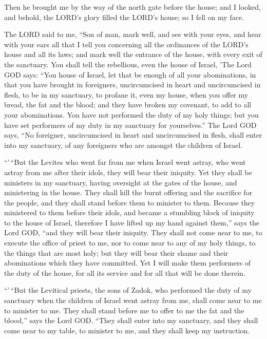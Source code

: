  Then he brought me by the way of the north gate before
the house; and I looked, and behold, the LORD's glory filled the LORD's
house; so I fell on my face.

 The LORD said to me, ``Son of man, mark well, and see
with your eyes, and hear with your ears all that I tell you concerning
all the ordinances of the LORD's house and all its laws; and mark well
the entrance of the house, with every exit of the sanctuary.
 You shall tell the rebellious, even the house of Israel,
'The Lord GOD says: ``You house of Israel, let that be enough of all
your abominations,  in that you have brought in
foreigners, uncircumcised in heart and uncircumcised in flesh, to be in
my sanctuary, to profane it, even my house, when you offer my bread, the
fat and the blood; and they have broken my covenant, to add to all your
abominations.  You have not performed the duty of my holy
things; but you have set performers of my duty in my sanctuary for
yourselves.''  The Lord GOD says, ``No foreigner,
uncircumcised in heart and uncircumcised in flesh, shall enter into my
sanctuary, of any foreigners who are amongst the children of Israel.

 ``'\,``But the Levites who went far from me when Israel
went astray, who went astray from me after their idols, they will bear
their iniquity.  Yet they shall be ministers in my
sanctuary, having oversight at the gates of the house, and ministering
in the house. They shall kill the burnt offering and the sacrifice for
the people, and they shall stand before them to minister to them.
 Because they ministered to them before their idols, and
became a stumbling block of iniquity to the house of Israel, therefore I
have lifted up my hand against them,'' says the Lord GOD, ``and they
will bear their iniquity.  They shall not come near to
me, to execute the office of priest to me, nor to come near to any of my
holy things, to the things that are most holy; but they will bear their
shame and their abominations which they have committed. 
Yet I will make them performers of the duty of the house, for all its
service and for all that will be done therein.

 ``'\,``But the Levitical priests, the sons of Zadok, who
performed the duty of my sanctuary when the children of Israel went
astray from me, shall come near to me to minister to me. They shall
stand before me to offer to me the fat and the blood,'' says the Lord
GOD.  ``They shall enter into my sanctuary, and they
shall come near to my table, to minister to me, and they shall keep my
instruction.

